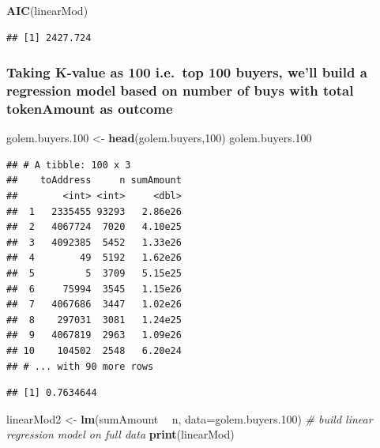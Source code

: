 \documentclass[]{article}
\newenvironment{Shaded}{\begin{snugshade}}{\end{snugshade}}
\newcommand{\KeywordTok}[1]{\textcolor[rgb]{0.13,0.29,0.53}{\textbf{#1}}}
\newcommand{\DataTypeTok}[1]{\textcolor[rgb]{0.13,0.29,0.53}{#1}}
\newcommand{\DecValTok}[1]{\textcolor[rgb]{0.00,0.00,0.81}{#1}}
\newcommand{\StringTok}[1]{\textcolor[rgb]{0.31,0.60,0.02}{#1}}
\newcommand{\CommentTok}[1]{\textcolor[rgb]{0.56,0.35,0.01}{\textit{#1}}}
\newcommand{\OperatorTok}[1]{\textcolor[rgb]{0.81,0.36,0.00}{\textbf{#1}}}
\newcommand{\NormalTok}[1]{#1}
\begin{document}
\begin{Shaded}
\begin{Highlighting}[]
\KeywordTok{AIC}\NormalTok{(linearMod)}
\end{Highlighting}
\end{Shaded}

\begin{verbatim}
## [1] 2427.724
\end{verbatim}

\subsubsection{Taking K-value as 100 i.e.~top 100 buyers, we'll build a
regression model based on number of buys with total tokenAmount as
outcome}\label{taking-k-value-as-100-i.e.top-100-buyers-well-build-a-regression-model-based-on-number-of-buys-with-total-tokenamount-as-outcome}

\begin{Shaded}
\begin{Highlighting}[]
\NormalTok{golem.buyers.}\DecValTok{100}\NormalTok{ <-}\StringTok{ }\KeywordTok{head}\NormalTok{(golem.buyers,}\DecValTok{100}\NormalTok{)}
\NormalTok{golem.buyers.}\DecValTok{100}
\end{Highlighting}
\end{Shaded}

\begin{verbatim}
## # A tibble: 100 x 3
##    toAddress     n sumAmount
##        <int> <int>     <dbl>
##  1   2335455 93293   2.86e26
##  2   4067724  7020   4.10e25
##  3   4092385  5452   1.33e26
##  4        49  5192   1.62e26
##  5         5  3709   5.15e25
##  6     75994  3545   1.15e26
##  7   4067686  3447   1.02e26
##  8    297031  3081   1.24e25
##  9   4067819  2963   1.09e26
## 10    104502  2548   6.20e24
## # ... with 90 more rows
\end{verbatim}

\begin{Shaded}
\end{Shaded}

\begin{verbatim}
## [1] 0.7634644
\end{verbatim}

\begin{Shaded}
\begin{Highlighting}[]
\NormalTok{linearMod2 <-}\StringTok{ }\KeywordTok{lm}\NormalTok{(sumAmount }\OperatorTok{~}\StringTok{ }\NormalTok{n, }\DataTypeTok{data=}\NormalTok{golem.buyers.}\DecValTok{100}\NormalTok{)  }\CommentTok{# build linear regression model on full data}
\KeywordTok{print}\NormalTok{(linearMod)}
\end{Highlighting}
\end{Shaded}
\end{document}
